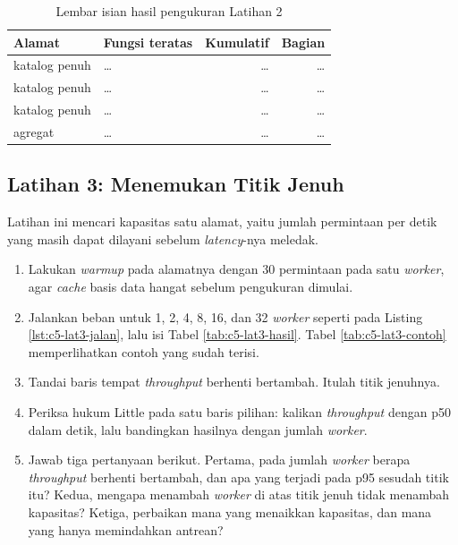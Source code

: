 \begin{table}[!htb]
  \centering
  \caption{Lembar isian hasil pengukuran Latihan 2}
  \label{tab:c5-lat2-hasil}
  \begin{tabularx}{\textwidth}{lXrr}
    \hline
    \textbf{Alamat} & \textbf{Fungsi teratas} & \textbf{Kumulatif} & \textbf{Bagian} \\
    \hline
    katalog penuh & \dots & \dots & \dots \\
    \hline
    katalog penuh & \dots & \dots & \dots \\
    \hline
    katalog penuh & \dots & \dots & \dots \\
    \hline
    agregat & \dots & \dots & \dots \\
    \hline
  \end{tabularx}
\end{table}

\subsection*{Latihan 3: Menemukan Titik Jenuh}

Latihan ini mencari kapasitas satu alamat, yaitu jumlah permintaan per detik
yang masih dapat dilayani sebelum \textit{latency}-nya meledak.

\begin{enumerate}
  \item Lakukan \textit{warmup} pada alamatnya dengan 30 permintaan pada
        satu \textit{worker},
        agar \textit{cache} basis data hangat sebelum pengukuran dimulai.
  \item Jalankan beban untuk 1, 2, 4, 8, 16, dan 32 \textit{worker} seperti
        pada Listing \ref{lst:c5-lat3-jalan}, lalu isi Tabel \ref{tab:c5-lat3-hasil}. Tabel \ref{tab:c5-lat3-contoh}
        memperlihatkan contoh yang sudah terisi.
  \item Tandai baris tempat \textit{throughput} berhenti bertambah. Itulah
        titik jenuhnya.
  \item Periksa hukum Little pada satu baris pilihan: kalikan
        \textit{throughput} dengan p50 dalam detik, lalu bandingkan hasilnya
        dengan jumlah \textit{worker}.
  \item Jawab tiga pertanyaan berikut. Pertama, pada jumlah \textit{worker}
        berapa \textit{throughput} berhenti bertambah, dan apa yang terjadi
        pada p95 sesudah titik itu? Kedua, mengapa menambah \textit{worker}
        di atas titik jenuh tidak menambah kapasitas? Ketiga, perbaikan mana
        yang menaikkan kapasitas, dan mana yang hanya memindahkan antrean?
\end{enumerate}

